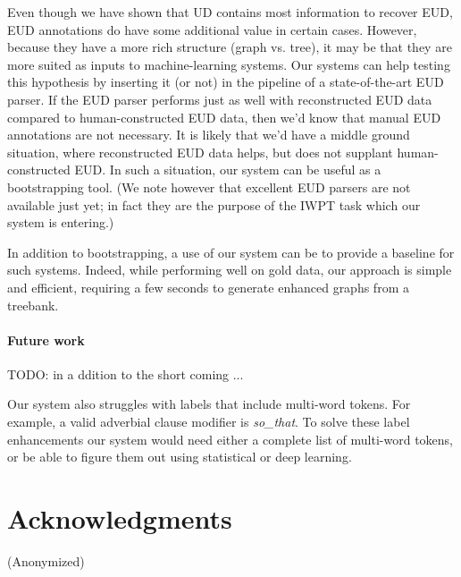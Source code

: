 \documentclass[11pt,a4paper]{article}
\begin{document}
Even though we have shown that UD contains most information to recover
EUD, EUD annotations do have some additional value in certain
cases. However, because they have a more rich structure (graph
vs. tree), it may be that they are more suited as inputs to
machine-learning systems. Our systems can help testing this hypothesis
by inserting it (or not) in the pipeline of a state-of-the-art EUD
parser. If the EUD parser performs just as well with reconstructed EUD
data compared to human-constructed EUD data, then we'd know that
manual EUD annotations are not necessary.  It is likely that we'd have
a middle ground situation, where reconstructed EUD data helps, but
does not supplant human-constructed EUD. In such a situation, our
system can be useful as a bootstrapping tool. (We note however that
excellent EUD parsers are not available just yet; in fact they are the
purpose of the IWPT task which our system is entering.)

In addition to bootstrapping, a use of our system can be to provide a
baseline for such systems.  Indeed, while performing well on gold
data, our approach is simple and efficient, requiring a few seconds to
generate enhanced graphs from a treebank.

\paragraph{ Future work }
TODO: in a ddition to the short coming ...

Our system also struggles with labels that include multi-word
tokens. For example, a valid adverbial clause modifier is
\textit{so\_that}. To solve these label enhancements our system
would need either a complete list of multi-word tokens, or be
able to figure them out using statistical or deep learning.



    
\section*{Acknowledgments}

(Anonymized)



\end{document}
